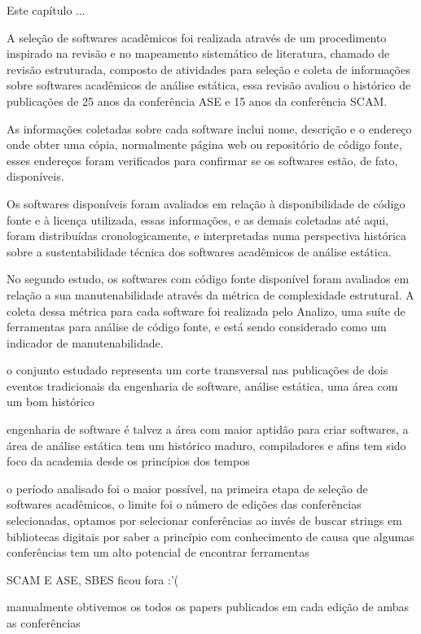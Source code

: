 {Este capítulo ... }
\label{metodologia}

A seleção de softwares acadêmicos foi realizada através de um procedimento
inspirado na revisão e no mapeamento sistemático de literatura, chamado de
revisão estruturada, composto de atividades para seleção e coleta de
informações sobre softwares acadêmicos de análise estática, essa revisão
avaliou o histórico de publicações de 25 anos da conferência ASE e 15 anos da
conferência SCAM.

As informações coletadas sobre cada software inclui nome, descrição e o
endereço onde obter uma cópia, normalmente página web ou repositório de código
fonte, esses endereços foram verificados para confirmar se os softwares estão,
de fato, disponíveis.

Os softwares disponíveis foram avaliados em relação à disponibilidade de código
fonte e à licença utilizada, essas informações, e as demais coletadas até aqui,
foram distribuídas cronologicamente, e interpretadas numa perspectiva histórica
sobre a sustentabilidade técnica dos softwares acadêmicos de análise estática.

No segundo estudo, os softwares com código fonte disponível foram avaliados em
relação a sua manutenabilidade através da métrica de complexidade estrutural. A
coleta dessa métrica para cada software foi realizada pelo Analizo, uma suíte
de ferramentas para análise de código fonte, e está sendo considerado como um
indicador de manutenabilidade.

o conjunto estudado representa um corte transversal nas
publicações de dois eventos tradicionais da engenharia
de software, análise estática, uma área com um bom histórico

engenharia de software é talvez a área com maior aptidão
para criar softwares, a área de análise estática tem um
histórico maduro, compiladores e afins tem sido foco da
academia desde os princípios dos tempos

o período analisado foi o maior possível, na primeira etapa
de seleção de softwares acadêmicos, o limite foi o número de
edições das conferências selecionadas, optamos por selecionar
conferências ao invés de buscar strings em bibliotecas digitais
por saber a princípio com conhecimento de causa que algumas
conferências tem um alto potencial de encontrar ferramentas

SCAM E ASE, SBES ficou fora :'(

manualmente obtivemos os todos os papers publicados em cada edição
de ambas as conferências

